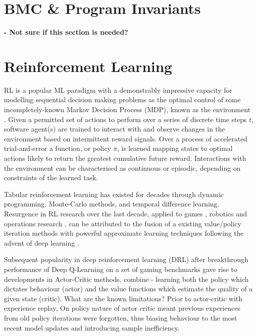 \documentclass[runningheads]{llncs}
\begin{document}
\section{BMC \& Program Invariants}\label{sec:preliminaries}

\textbf{- Not sure if this section is needed?}


\section{Reinforcement Learning}
RL is a popular ML paradigm with a demonstrably impressive capacity for modelling sequential decision making problems as the optimal control of some incompletely-known Markov Decision Process (MDP), known as the environment  \cite{sutton2018reinforcement}. Given a permitted set of actions to perform over a series of discrete time steps $t$, software agent(s) are trained to interact with and observe changes in the environment based on intermittent reward signals. Over a process of accelerated trial-and-error a function, or policy $\pi$, is learned mapping states to optimal actions likely to return the greatest cumulative future reward. Interactions with the environment can be characterised as continuous or episodic, depending on constraints of the learned task.
 
Tabular reinforcement learning has existed for decades through dynamic programming, Monte-Carlo methods, and temporal difference learning. Resurgence in RL research over the last decade, applied to games \cite{schaul2015prioritized, silver2016mastering, vinyals2019grandmaster}, robotics \cite{gu2017deep, bloesch2022towards} and operations research \cite{mazyavkina2021reinforcement}, can be attributed to the fusion of a existing value/policy iteration methods with powerful approximate learning techniques following the advent of deep learning \cite{lecun2015deep}.   

Subsequent popularity in deep reinforcement learning (DRL) after breakthrough performance of Deep Q-Learning on a set of gaming benchmarks \cite{mnih2013playing} gave rise to developments in Actor-Critic methods, combine   - learning both the policy which dictates behaviour (actor) and the value functions which estimate the quality of a given state (critic).
What are the known limitations? Prior to actor-critic with experience replay, On policy nature of actor critic meant previous experiences from old policy iterations were forgotten, thus  biasing behaviour to the most recent model updates and introducing sample inefficiency.  
\end{document}
